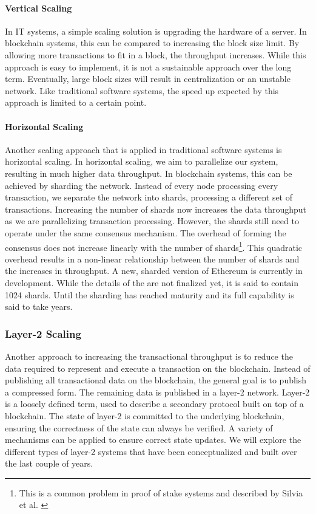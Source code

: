 \documentclass[../../thesis.tex]{subfiles}
\begin{document}
\paragraph{Vertical Scaling}
In IT systems, a simple scaling solution is upgrading the hardware of a server. In blockchain systems, this can be compared to increasing the block size limit. By allowing more transactions to fit in a block, the throughput increases. While this approach is easy to implement, it is not a sustainable approach over the long term. Eventually, large block sizes will result in centralization or an unstable network.  Like traditional software systems, the speed up expected by this approach is limited to a certain point.

\paragraph{Horizontal Scaling}
Another scaling approach that is applied in traditional software systems is horizontal scaling. In horizontal scaling, we aim to parallelize our system, resulting in much higher data throughput. In blockchain systems, this can be achieved by sharding the network. Instead of every node processing every transaction, we separate the network into shards, processing a different set of transactions. Increasing the number of shards now increases the data throughput as we are parallelizing transaction processing. However, the shards still need to operate under the same consensus mechanism. The overhead of forming the consensus does not increase linearly with the number of shards\footnote{This is a common problem in proof of stake systems and described by Silvia et al. \cite{silva2020comparison}}. This quadratic overhead results in a non-linear relationship between the number of shards and the increases in throughput. A new, sharded version of Ethereum is currently in development. While the details of the are not finalized yet, it is said to contain 1024 shards. Until the sharding has reached maturity and its full capability is said to take years.

\subsubsection{Layer-2 Scaling}
Another approach to increasing the transactional throughput is to reduce the data required to represent and execute a transaction on the blockchain. Instead of publishing all transactional data on the blockchain, the general goal is to publish a compressed form. The remaining data is published in a layer-2 network. Layer-2 is a loosely defined term, used to describe a secondary protocol built on top of a blockchain. The state of layer-2 is committed to the underlying blockchain, ensuring the correctness of the state can always be verified. A variety of mechanisms can be applied to ensure correct state updates. We will explore the different types of layer-2 systems that have been conceptualized and built over the last couple of years. 
\end{document}
